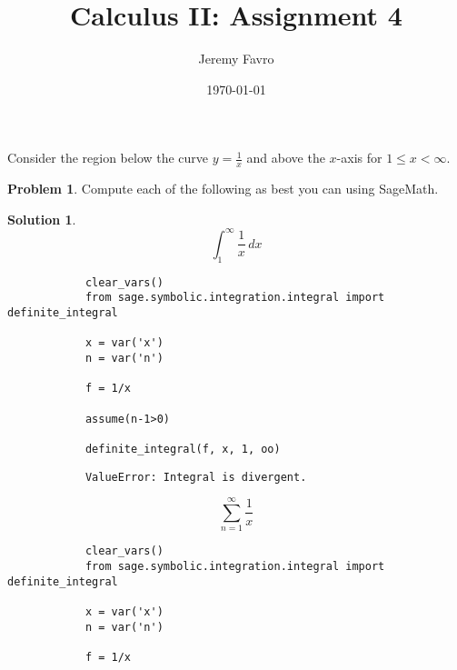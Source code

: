 \documentclass[10pt]{article}
\title{Calculus II: Assignment 4}
\author{Jeremy Favro}
\date{\today}
\makeatletter
\theoremstyle{definition}
\newtheorem{problem}{Problem}
\newtheorem{soln}{Solution}
\newcommand{\boxspacing}{\kern\kvtcb@left@rule\kern\kvtcb@boxsep}
\newcommand{\prompt}[4]{
    \ttfamily\llap{{\color{#2}[#3]:\hspace{3pt}#4}}\vspace{-\baselineskip}
}
\makeatother
\begin{document}
\maketitle

\noindent Consider the region below the curve $y = \frac{1}{x}$ and above the $x$-axis for $1 \leq x < \infty$.
\begin{problem}
Compute each of the following as best you can using SageMath.
\end{problem}
\begin{soln}
    $$\int_{1}^{\infty} \frac{1}{x} \,dx$$
    \begin{tcolorbox}[breakable, size=fbox, boxrule=1pt, pad at break*=1mm,colback=cellbackground, colframe=cellborder]
        \prompt{In}{incolor}{1}{\boxspacing}
        \begin{verbatim}
            clear_vars()
            from sage.symbolic.integration.integral import definite_integral
            
            x = var('x')
            n = var('n')
            
            f = 1/x
            
            assume(n-1>0)
            
            definite_integral(f, x, 1, oo)
        \end{verbatim}
    \end{tcolorbox}
    \begin{tcolorbox}[breakable, size=fbox, boxrule=.5pt, pad at break*=1mm, opacityfill=0]
        \prompt{Out}{outcolor}{1}{\boxspacing}
        \begin{verbatim}
            ValueError: Integral is divergent.
        \end{verbatim}
    \end{tcolorbox}

    $$\sum_{n = 1}^{\infty} \frac{1}{x}$$
    \begin{tcolorbox}[breakable, size=fbox, boxrule=1pt, pad at break*=1mm,colback=cellbackground, colframe=cellborder]
        \prompt{In}{incolor}{2}{\boxspacing}
        \begin{verbatim}
            clear_vars()
            from sage.symbolic.integration.integral import definite_integral
            
            x = var('x')
            n = var('n')
            
            f = 1/x
            

\end{verbatim}
\end{tcolorbox}
\end{soln}
\end{document}
